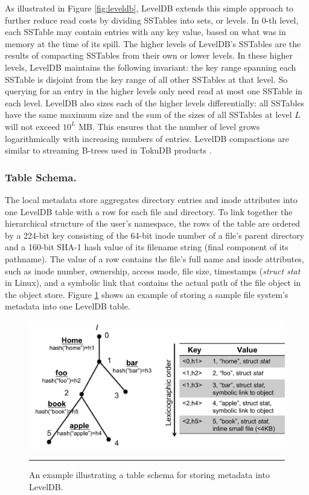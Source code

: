 As illustrated in Figure \ref{fig:leveldb}, LevelDB extends this simple approach to further reduce read costs by dividing SSTables into sets, or levels.
In 0-th level, each SSTable may contain entries with any key value, based on what was in memory at the time of its spill.
The higher levels of LevelDB's SSTables are the results of compacting SSTables from their own or lower levels.
In these higher levels, LevelDB maintains the following invariant: the key range spanning each SSTable is disjoint from the key range of all other SSTables at that level.
So querying for an entry in the higher levels only need read at most one SSTable in each level.
LevelDB also sizes each of the higher levels differentially:  all SSTables have the same maximum size and the sum of the sizes of all SSTables at level $L$ will not exceed $10^L$ MB.
This ensures that the number of level grows logarithmically with increasing numbers of entries.
LevelDB compactions are similar to streaming B-trees used in TokuDB products
\cite{Bender2007, tokufs}.

\subsubsection*{Table Schema. } 

The local metadata store aggregates directory entries and  
inode attributes into one LevelDB table with a row for each file and directory.
To link together the hierarchical structure of the user's namespace,
the rows of the table are ordered by a 224-bit key consisting of 
the 64-bit inode number of a file's parent directory 
and a 160-bit SHA-1 hash value of its filename string (final component of its pathname).
The value of a row contains the file's full name and inode attributes,
such as inode number, ownership, access mode, file size, timestamps (\textit{struct stat} in Linux),
and a symbolic link that contains the actual path of the file object in the object store.
Figure \ref{fig:schema} shows an example of storing a sample file system's metadata into one LevelDB table.

\begin{figure}[t]
\centering
\includegraphics[scale=0.35]{figs/schema}
\caption{An example illustrating a table schema for storing metadata into LevelDB.}
\vspace{10pt}
\hrule 
\label{fig:schema}
\end{figure}

